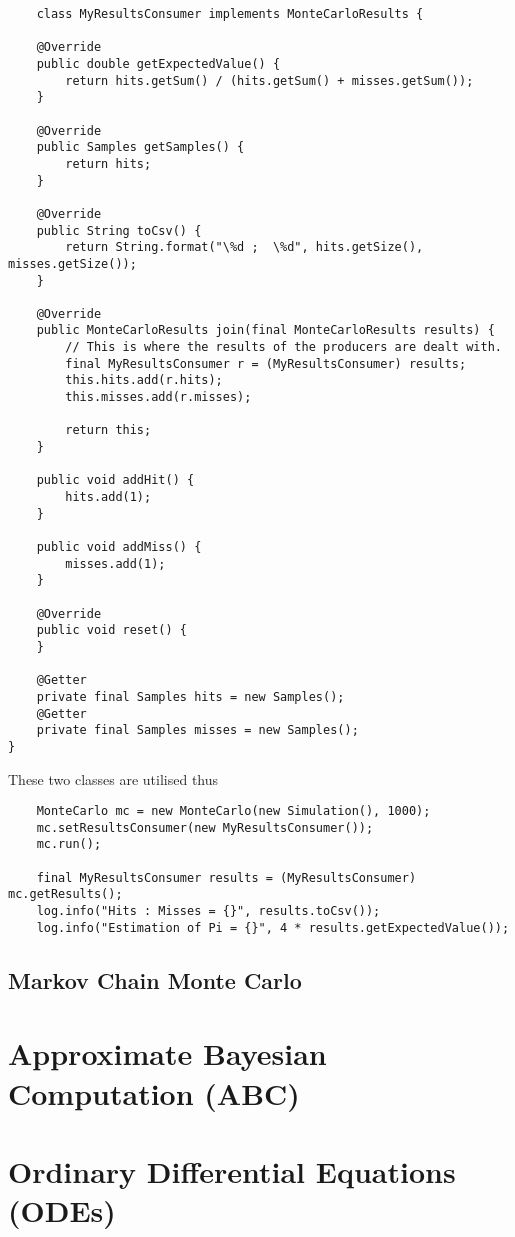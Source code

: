 \begin{lstlisting}
    class MyResultsConsumer implements MonteCarloResults {

    @Override
    public double getExpectedValue() {
        return hits.getSum() / (hits.getSum() + misses.getSum());
    }

    @Override
    public Samples getSamples() {
        return hits;
    }

    @Override
    public String toCsv() {
        return String.format("\%d ;  \%d", hits.getSize(), misses.getSize());
    }

    @Override
    public MonteCarloResults join(final MonteCarloResults results) {
        // This is where the results of the producers are dealt with.
        final MyResultsConsumer r = (MyResultsConsumer) results;
        this.hits.add(r.hits);
        this.misses.add(r.misses);

        return this;
    }

    public void addHit() {
        hits.add(1);
    }

    public void addMiss() {
        misses.add(1);
    }
    
    @Override
    public void reset() {
    }
    
    @Getter
    private final Samples hits = new Samples();
    @Getter
    private final Samples misses = new Samples();
}
\end{lstlisting}

These two classes are utilised thus
\begin{lstlisting}
    MonteCarlo mc = new MonteCarlo(new Simulation(), 1000);
    mc.setResultsConsumer(new MyResultsConsumer());
    mc.run();

    final MyResultsConsumer results = (MyResultsConsumer) mc.getResults();
    log.info("Hits : Misses = {}", results.toCsv());
    log.info("Estimation of Pi = {}", 4 * results.getExpectedValue());
\end{lstlisting}




\subsection{Markov Chain Monte Carlo}

\section{Approximate Bayesian Computation (ABC)}

\section{Ordinary Differential Equations (ODEs)}



